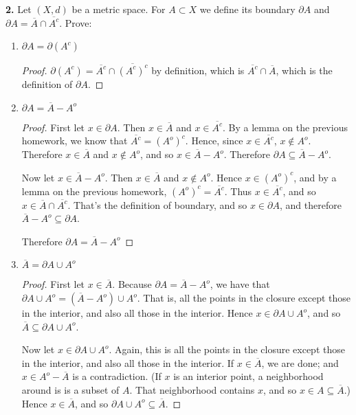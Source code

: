 \documentclass{article}
\newcommand{\ol}[1]{\overline{#1}}
\begin{document}
\newpage %

\textbf{2. }
Let $(X, d)$ be a metric space. For $A \subset X$ we define its boundary $\partial A$ and $\partial A = \overline{A} \cap \overline{A^c}$. Prove:

\renewcommand{\labelenumi}{(\alph{enumi})}
\begin{enumerate}
    \item %
    $\partial A = \partial(A^c)$
    \begin{proof}
        $\partial(A^c) = \overline{A^c} \cap \ol{(A^c)^c}$ by definition, which is $\ol {A^c} \cap \ol A$, which is the definition of $\partial A$.
    \end{proof}


    \item %
    $\partial A = \overline{A} - A^o$
    \begin{proof}
        First let $x \in \partial A$. Then $x \in \ol{A}$ and $x \in \ol{A^c}$. By a lemma on the previous homework, we know that $\ol{A^c} = (A^o)^c$. Hence, since $x \in \ol{A^c}$, $x \notin A^o$. Therefore $x \in \ol{A}$ and $x \notin A^o$, and so $x \in \ol{A} - A^o$. Therefore $\partial A \subseteq \ol{A} - A^o$.

        Now let $x \in \ol{A} - A^o$. Then $x \in \ol{A}$ and $x \notin A^o$. Hence $x \in (A^o)^c$, and by a lemma on the previous homework, $(A^o)^c = \ol{A^c}$. Thus $x \in \ol{A^c}$, and so $x \in \ol{A} \cap \ol{A^c}$. That's the definition of boundary, and so $x \in \partial{A}$, and therefore $\ol{A} - A^o \subseteq \partial A$. 

        Therefore $\partial A = \overline{A} - A^o$
    \end{proof}


    \item %
    $\overline{A} = \partial A \cup A^o$
    \begin{proof}
        First let $x \in \ol{A}$. 
        Because $\partial A = \ol{A} - A^o$, we have that $\partial A \cup A^o = (\ol{A} - A^o) \cup A^o$. That is, all the points in the closure except those in the interior, and also all those in the interior. Hence $x \in \partial A \cup A^o$, and so $\ol{A} \subseteq \partial A \cup A^o$.

        Now let $x \in \partial A \cup A^o$. Again, this is all the points in the closure except those in the interior, and also all those in the interior. If $x \in \ol{A}$, we are done; and $x \in A^o - \ol{A}$ is a contradiction. (If $x$ is an interior point, a neighborhood around is is a subset of $A$. That neighborhood contains $x$, and so $x \in A \subseteq \ol{A}$.) Hence $x \in \ol{A}$, and so $\partial A \cup A^o \subseteq \ol{A}$.


\end{proof}
\end{enumerate}
\end{document}
